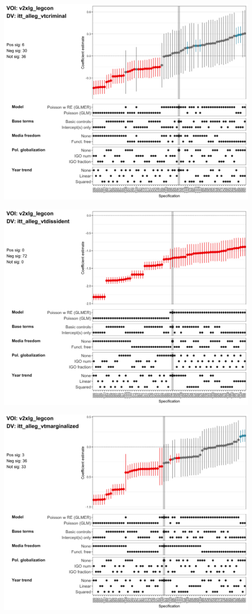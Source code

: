 \documentclass[]{article}
\begin{document}
\includegraphics[height=4in]{../output/figures-robustness/specplot-v2xlg_legcon-itt_alleg_vtcriminal.png}

\includegraphics[height=4in]{../output/figures-robustness/specplot-v2xlg_legcon-itt_alleg_vtdissident.png}

\includegraphics[height=4in]{../output/figures-robustness/specplot-v2xlg_legcon-itt_alleg_vtmarginalized.png}
\end{document}
